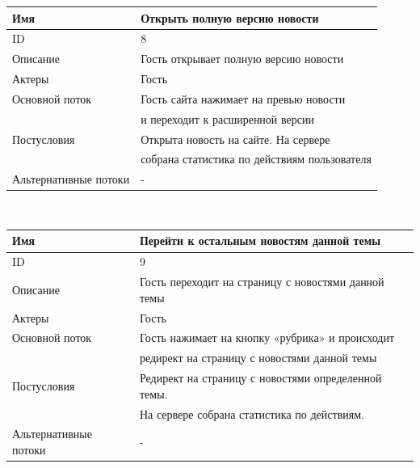 \begin{center}
    \begin{tabular}{|l|l|}
        \hline
        Имя                   & Открыть полную версию новости                \\
        \hline
        ID                    & 8                                            \\
        \hline
        Описание              & Гость открывает полную версию новости        \\
        \hline
        Актеры                & Гость                                        \\
        \hline
        Основной поток        & Гость сайта нажимает на превью новости       \\
        & и переходит к расширенной версии             \\
        \hline
        Постусловия           & Открыта новость на сайте. На сервере         \\
        & собрана статистика по действиям пользователя \\
        \hline
        Альтернативные потоки & -                                            \\
        \hline
    \end{tabular}\\
    \vspace{0.5cm}
    \begin{tabular}{|l|l|}
        \hline
        Имя                   & Перейти к остальным новостям данной темы            \\
        \hline
        ID                    & 9                                                   \\
        \hline
        Описание              & Гость переходит на страницу с новостями данной темы \\
        \hline
        Актеры                & Гость                                               \\
        \hline
        Основной поток        & Гость нажимает на кнопку «рубрика» и происходит     \\
        & редирект на страницу с новостями данной темы        \\
        \hline
        Постусловия           & Редирект на страницу с новостями определенной темы. \\
        & На сервере собрана статистика по действиям.         \\
        \hline
        Альтернативные потоки & -                                                   \\

\end{tabular}
\end{center}
